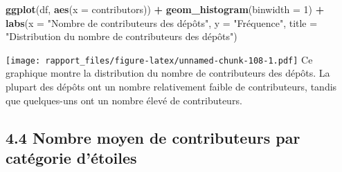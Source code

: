 \documentclass[
]{article}
\newenvironment{Shaded}{\begin{snugshade}}{\end{snugshade}}
\newcommand{\AttributeTok}[1]{\textcolor[rgb]{0.13,0.29,0.53}{#1}}
\newcommand{\DecValTok}[1]{\textcolor[rgb]{0.00,0.00,0.81}{#1}}
\newcommand{\FunctionTok}[1]{\textcolor[rgb]{0.13,0.29,0.53}{\textbf{#1}}}
\newcommand{\NormalTok}[1]{#1}
\newcommand{\SpecialCharTok}[1]{\textcolor[rgb]{0.81,0.36,0.00}{\textbf{#1}}}
\newcommand{\StringTok}[1]{\textcolor[rgb]{0.31,0.60,0.02}{#1}}
\begin{document}
\begin{Shaded}
\begin{Highlighting}[]
\FunctionTok{ggplot}\NormalTok{(df, }\FunctionTok{aes}\NormalTok{(}\AttributeTok{x =}\NormalTok{ contributors)) }\SpecialCharTok{+}
  \FunctionTok{geom\_histogram}\NormalTok{(}\AttributeTok{binwidth =} \DecValTok{1}\NormalTok{) }\SpecialCharTok{+}
  \FunctionTok{labs}\NormalTok{(}\AttributeTok{x =} \StringTok{"Nombre de contributeurs des dépôts"}\NormalTok{,}
       \AttributeTok{y =} \StringTok{"Fréquence"}\NormalTok{,}
       \AttributeTok{title =} \StringTok{"Distribution du nombre de contributeurs des dépôts"}\NormalTok{)}
\end{Highlighting}
\end{Shaded}

\texttt{[image: rapport\_files/figure-latex/unnamed-chunk-108-1.pdf]} Ce
graphique montre la distribution du nombre de contributeurs des dépôts.
La plupart des dépôts ont un nombre relativement faible de
contributeurs, tandis que quelques-uns ont un nombre élevé de
contributeurs.

\subsection{4.4 Nombre moyen de contributeurs par catégorie
d'étoiles}\label{nombre-moyen-de-contributeurs-par-catuxe9gorie-duxe9toiles}
\end{document}

